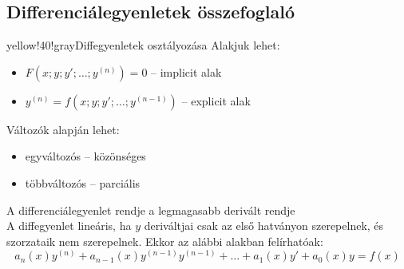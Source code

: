 \documentclass[main.tex]{subfiles}
\begin{document}
\subsection{Differenciálegyenletek összefoglaló}

\begin{cbox}{yellow!40!gray}{Diffegyenletek osztályozása}
  Alakjuk lehet:
  \begin{itemize}
    \item $F(x;y;y';\dots;y^{(n)}) = 0$
          \tabto{5.35cm} – \tabto{6cm} implicit alak

    \item $y^{(n)} = f(x;y;y';\dots;y^{(n-1)})$
          \tabto{5.35cm} – \tabto{6cm} explicit alak
  \end{itemize}

  Változók alapján lehet:
  \begin{itemize}
    \item egyváltozós
          \tabto{2.6cm} – \tabto{3.2cm} közönséges

    \item többváltozós
          \tabto{2.6cm} – \tabto{3.2cm} parciális
  \end{itemize}

  A differenciálegyenlet rendje a legmagasabb derivált rendje
  \\[2mm]
  A diffegyenlet lineáris, ha $y$ deriváltjai csak az első
  hatványon szerepelnek, és szorzataik nem szerepelnek.
  Ekkor az alábbi alakban felírhatóak:
  \[
    a_n(x) y^{(n)}
    + a_{n-1}(x) y^{(n-1)} y^{(n-1)}
    + \dots
    + a_1(x) y'
    + a_0(x) y
    = f(x)
  \]
\end{cbox}
\end{document}
